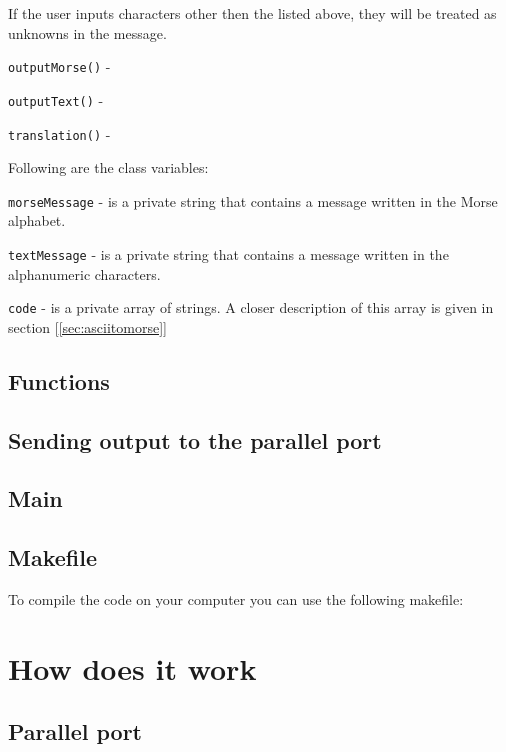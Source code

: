 \documentclass[12pt]{report}
\begin{document}
If the user inputs characters other then the listed above, they will be treated as unknowns in the message.


\verb|outputMorse()| - 



\verb|outputText()| - 



\verb|translation()| - 


Following are the class variables:

\verb|morseMessage| - is a private string that contains a message written in the Morse alphabet.


\verb|textMessage| - is a private string that contains a message written in the alphanumeric characters.


\verb|code| - is a private array of strings. A closer description of this array is given in section [\ref{sec:asciitomorse}]


\subsection{Functions}










\subsection{Sending output to the parallel port}



\subsection{Main}



\subsection{Makefile}

To compile the code on your computer you can use the following makefile:




\section{How does it work}



\subsection{Parallel port}
\end{document}
